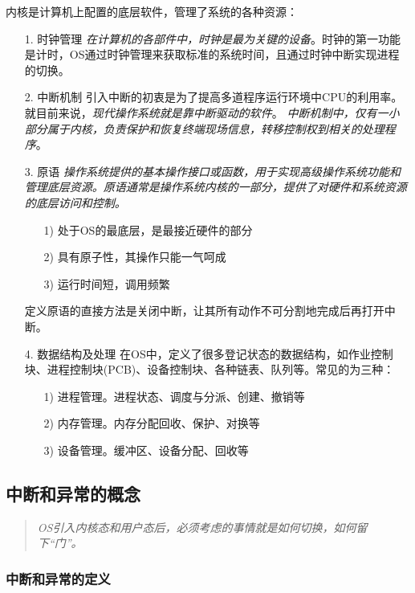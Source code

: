     内核是计算机上配置的底层软件，管理了系统的各种资源：

\begin{itemize}
    \item [1.] 时钟管理
    \subitem \emph{\color{red}在计算机的各部件中，时钟是最为关键的设备}。时钟的第一功能是计时，OS通过时钟管理来获取标准的系统时间，且通过时钟中断实现进程的切换。
    \item [2.] 中断机制
    \subitem 引入中断的初衷是为了提高多道程序运行环境中CPU的利用率。就目前来说，\emph{\color{red}现代操作系统就是靠中断驱动的软件}。
    \subitem \emph{中断机制中，仅有一小部分属于内核，负责保护和恢复终端现场信息，转移控制权到相关的处理程序}。
    \item [3.] 原语
    \subitem \emph{操作系统提供的基本操作接口或函数，用于实现高级操作系统功能和管理底层资源。原语通常是操作系统内核的一部分，提供了对硬件和系统资源的底层访问和控制。}
    \begin{itemize}
        \item [1)] 处于OS的最底层，是最接近硬件的部分
        \item [2)] 具有原子性，其操作只能一气呵成
        \item [3)] 运行时间短，调用频繁 
    \end{itemize}
    \subitem 定义原语的直接方法是关闭中断，让其所有动作不可分割地完成后再打开中断。
    \item [4.] 数据结构及处理
    \subitem 在OS中，定义了很多登记状态的数据结构，如作业控制块、进程控制块(PCB)、设备控制块、各种链表、队列等。常见的为三种：
    \begin{itemize}
        \item [1)] 进程管理。进程状态、调度与分派、创建、撤销等
        \item [2)] 内存管理。内存分配回收、保护、对换等
        \item [3)] 设备管理。缓冲区、设备分配、回收等
    \end{itemize}
\end{itemize}

\subsection{中断和异常的概念}

\begin{quote}
    \emph{OS引入内核态和用户态后，必须考虑的事情就是如何切换，如何留下“门”。}
\end{quote}

\subsubsection{中断和异常的定义}

